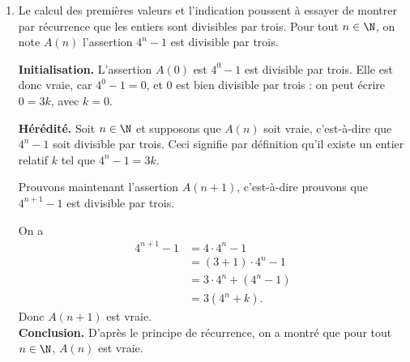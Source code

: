 \begin{Soln}{30}
\begin{center}
\end{center}

\begin{enumerate}
\item Le calcul des premières valeurs et l'indication poussent à essayer de montrer par récurrence que les entiers sont divisibles par trois. Pour tout $n\in \N$, on note $A(n)$ l'assertion \og $4^n-1$ est divisible par trois.\fg

\textbf{Initialisation.} L'assertion $A(0)$ est \og $4^0-1$ est divisible par trois\fg. Elle est donc vraie, car $4^0-1=0$, et $0$ est bien divisible par trois : on peut écrire $0=3k$, avec $k=0$.

\textbf{Hérédité.} Soit $n\in \N$ et supposons que $A(n)$ soit vraie, c'est-à-dire que $4^n-1$ soit divisible par trois. Ceci signifie par définition qu'il existe un entier relatif $k$ tel que $4^n-1=3k$.

Prouvons maintenant l'assertion $A(n+1)$, c'est-à-dire prouvons que $4^{n+1}-1$ est divisible par trois.

On a
\begin{align*}
4^{n+1}-1 &= 4\cdot 4^n - 1\\
		  &= (3+1)\cdot 4^n - 1\\
		  &= 3\cdot 4^n + (4^n-1)\\
		  &= 3(4^n+k).
\end{align*}
Donc $A(n+1)$ est vraie.\\
\textbf{Conclusion.} D'après le principe de récurrence, on a montré que pour tout $n\in \N$, $A(n)$ est vraie.\\




\end{enumerate}
\end{Soln}
